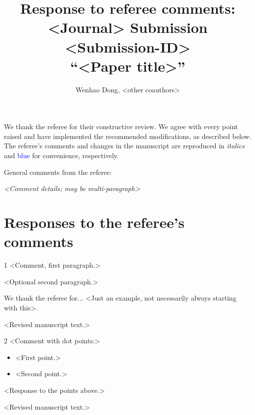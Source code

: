\documentclass[11pt]{article}
\title{Response to referee comments: <Journal> Submission <Submission-ID>\\
\large``<Paper title>''}
\author{Wenhao Dong, <other coauthors>}
\begin{document}
\maketitle

We thank the referee for their constructive review. We agree with every point raised and have implemented the recommended modifications, as described below.
The referee's comments and changes in the manuscript are reproduced in \textit{italics} and \textcolor{blue}{blue} for convenience, respectively.

\vspace{4mm}

\noindent
General comments from the referee:

{\itshape <Comment details; may be multi-paragraph>\par}

\section*{Responses to the referee's comments}
\begin{refereecomment}{1}
  <Comment, first paragraph.>

  <Optional second paragraph.>
\end{refereecomment}
\begin{authorresponse}
  We thank the referee for... <Just an example, not necessarily always starting with this>.

  \begin{manuscriptchange}
    <Revised manuscript text.>
  \end{manuscriptchange}
\end{authorresponse}

\begin{refereecomment}{2}
  <Comment with dot points:>
  \begin{itemize}
    \item <First point.>
    \item <Second point.>
  \end{itemize}
\end{refereecomment}
\begin{authorresponse}
  <Response to the points above.>

  \begin{manuscriptchange}
    <Revised manuscript text.>
  \end{manuscriptchange}
\end{authorresponse}
\end{document}

